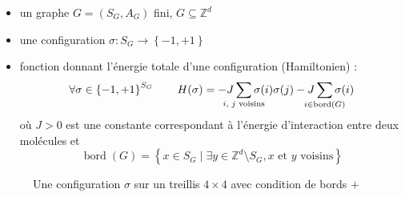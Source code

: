 \documentclass[french]{beamer}
\DeclareMathOperator{\bord}{bord}
\begin{document}
\begin{frame}
    \begin{itemize}
        \item un graphe \(G = \left(S_G, A_G\right) \) fini, \(G \subseteq \mathbb{Z}^d \)
        \item une configuration \(\sigma : S_G \to \left\{-1, +1\right\} \)
        \item fonction donnant l'énergie totale d'une configuration (Hamiltonien) :
        \[
        \forall \sigma \in \left\{-1, +1\right\}^{S_G} \qquad H(\sigma) = - J \sum_{\mathclap{\text{$i$, $j$ voisins}}} \sigma(i)\sigma(j)
                 - J \sum_{\mathclap{i \in \bord(G)}} \sigma(i)
        \]
        où \(J > 0\) est une constante correspondant à l'énergie d'interaction entre deux molécules et
        \[
        \bord(G) = \left\{x \in S_G \mid \exists y \in \mathbb{Z}^d\setminus S_G, \text{$x$ et $y$ voisins} \right\}
        \]
    \end{itemize}
\end{frame}




\begin{frame}
\begin{figure}
    \centering
    \caption{Une configuration $\sigma$ sur un treillis $4\times4$ avec condition de bords $+$}
\end{figure}
\end{frame}
\end{document}
